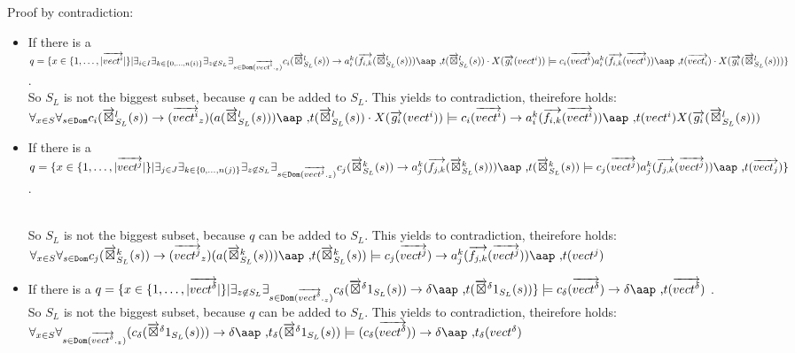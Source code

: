 \documentclass[a4paper,10pt]{article}
\theoremstyle{plain}
\theoremstyle{definition}
\newcommand{\ovr}{\overrightarrow}
\newcommand{\at}[1]{\mbox{\aap ,} #1}
\begin{document}
Proof by contradiction:
\begin{itemize}
\item If there is a $q = \lbrace x \in \lbrace 1, \ldots, \vert \ovr{vect^i} \vert \rbrace \vert \exists_{i \in I}\exists_{k \in \lbrace 0, \ldots , n(i) \rbrace}\exists_{z \not\in S_L}\exists_{s \in  \texttt{Dom}(\ovr{vect^i}._z)}\\ 
c_i(\zi) \rightarrow a_i^k(\ovr{f_{i,k}}(\zi)) \at t(\zi) \cdot X(\ovr{g_i}(vect^i))\models c_i(\ovr{vect^i})a_i^k(\ovr{f_{i,k}}(\ovr{vect^i})) \at t(\ovr{vect_i}) \cdot X(\ovr{g_i}(\zi))\rbrace$.\\ 

So $S_L$ is not the biggest subset, because $q$ can be added to $S_L$. This yields to contradiction, theirefore holds:\\ 
$\forall_{x \in S}\forall_{s \in  \texttt{Dom}} c_i(\zi) \rightarrow (\ovr{vect^i}_z) (a(\zi)) \at t(\zi) \cdot X(\ovr{g_i}(vect^i)) \models \\
c_i(\ovr{vect^i}) \rightarrow a_i^k (\ovr{f_{i,k}}(\ovr{vect^i})) \at t(vect^i) X(\ovr{g_i}(\zi))$ 

\item If there is a $q = \lbrace x \in \lbrace 1, \ldots, \vert \ovr{vect^j} \vert \rbrace \vert \exists_{j \in J}\exists_{k \in \lbrace 0, \ldots , n(j) \rbrace}\exists_{z \not\in S_L}\exists_{s \in \texttt{Dom}(\ovr{vect^j}._z)  } \\
c_j(\zj) \rightarrow a_j^k(\ovr{f_{j,k}}(\zj)) \at t(\zj)\models c_j(\ovr{vect^j})a_j^k(\ovr{f_{j,k}}(\ovr{vect^j})) \at t(\ovr{vect_j}) \rbrace$.\\ \

So $S_L$ is not the biggest subset, because $q$ can be added to $S_L$. This yields to contradiction, theirefore holds:\\
$\forall_{x \in S}\forall_{s \in  \texttt{Dom}} c_j(\zj) \rightarrow (\ovr{vect^j}_z) (a(\zj)) \at t(\zj) \models \\
c_j(\ovr{vect^j}) \rightarrow a_j^k (\ovr{f_{j,k}}(\ovr{vect^j})) \at t(vect^j)$

\item If there is a $q = \lbrace x \in \lbrace 1, \ldots, \vert \ovr{vect^\delta} \vert \rbrace \vert 
\exists_{z \not\in S_L}\exists_{s \in \texttt{Dom}(\ovr{vect^\delta}._z)  } c_\delta(\zd)  \rightarrow \delta \at t(\zd) \rbrace \models c_\delta(\ovr{vect^\delta}) \rightarrow \delta \at t(\ovr{vect^\delta})$ .\\

So $S_L$ is not the biggest subset, because $q$ can be added to $S_L$. This yields to contradiction, theirefore holds:\\
$\forall_{x \in S}\forall_{s \in  \texttt{Dom}(\ovr{vect^\delta}._z)}
 (c_\delta(\zd )) \rightarrow \delta \at t_\delta(\zd) \models
(c_\delta(\ovr{vect^\delta})) \rightarrow \delta \at t_\delta(vect^\delta) $
\end{itemize}
\end{document}
